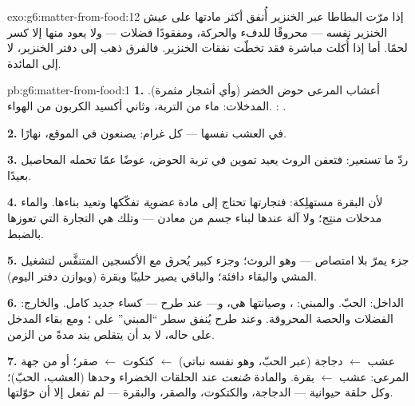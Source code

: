\begin{solution}{exo:g6:matter-from-food:12}
إذا مرّت البطاطا عبر الخنزير أُنفق أكثر مادتها على عيش الخنزير
نفسه --- محروقًا للدفء والحركة، ومفقودًا فضلات --- ولا يعود منها
إلا كسر لحمًا. أما إذا أُكلت مباشرة فقد تخطّت نفقات الخنزير.
فالفرق ذهب إلى دفتر الخنزير، لا إلى المائدة.
\end{solution}

\begin{solution}{pb:g6:matter-from-food:1}
\textbf{1.} أعشاب المرعى  حوض الخضر (وأي أشجار مثمرة).
المدخلات: ماء  من التربة، وثاني أكسيد الكربون من
الهواء. : .

\textbf{2.} في   العشب نفسها --- كل غرام: 
يصنعون في الموقع، نهارًا.

\textbf{3.} ردّ ما تستعير: فتعفن الروث يعيد تموين  في تربة الحوض، عوضًا عمّا تحمله المحاصيل بعيدًا.

\textbf{4.} لأن البقرة مستهلِكة: فتجارتها تحتاج إلى مادة
\emph{عضوية} تفكّكها وتعيد بناءها.  والماء
مدخلات منتِج؛ ولا آلة عندها لبناء جسم من معادن --- وتلك هي التجارة
التي تعوزها بالضبط.

\textbf{5.} جزء يمرّ بلا امتصاص --- وهو الروث؛ وجزء كبير يُحرق مع
الأكسجين المتنفَّس لتشغيل المشي  والبقاء دافئة؛ والباقي يصير
حليبًا وبقرة (ويوازن دفتر اليوم).

\textbf{6.} الداخل: الحبّ. والمبني: ، وصيانتها هي، و--- عند
طرح  --- كساء  جديد كامل. والخارج: الفضلات والحصة
المحروقة. وعند طرح  يُنفق سطر ``المبني'' على ؛ ومع بقاء
المدخل على حاله، لا بد أن يتقلص بند  مدةً من الزمن.

\textbf{7.} عشب $\leftarrow$ دجاجة (عبر الحبّ، وهو نفسه
 نباتي) $\leftarrow$ كتكوت $\leftarrow$ صقر؛ أو من جهة
المرعى: عشب $\leftarrow$ بقرة. والمادة \emph{صُنعت} عند
الحلقات الخضراء وحدها (العشب،  الحبّ)؛ وكل حلقة حيوانية ---
الدجاجة، والكتكوت، والصقر، والبقرة --- لم تفعل إلا أن حوّلتها.


\end{solution}

